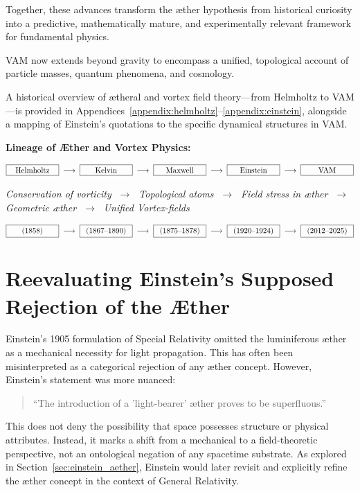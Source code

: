 \documentclass[preprint,notitlepage]{revtex4-2}
\begin{document}
Together, these advances transform the æther hypothesis from historical curiosity into a predictive, mathematically mature, and experimentally relevant framework for fundamental physics.

VAM now extends beyond gravity to encompass a unified, topological account of particle masses, quantum phenomena, and cosmology.

A historical overview of ætheral and vortex field theory—from Helmholtz to VAM—is provided in Appendices~\ref{appendix:helmholtz}–\ref{appendix:einstein}, alongside a mapping of Einstein’s quotations to the specific dynamical structures in VAM.

\vspace{1em}
\noindent\textbf{Lineage of Æther and Vortex Physics:}

\[\fbox{\makebox[2.2cm][c]{Helmholtz}} \;\longrightarrow\;\fbox{\makebox[2.2cm][c]{Kelvin}} \;\longrightarrow\;\fbox{\makebox[2.2cm][c]{Maxwell}} \;\longrightarrow\;\fbox{\makebox[2.2cm][c]{Einstein}} \;\longrightarrow\;\fbox{\makebox[2.2cm][c]{VAM}}\]

\begin{center}
\scriptsize
\textit{
Conservation of vorticity $\;\rightarrow\;$ Topological atoms $\;\rightarrow\;$ Field stress in æther $\;\rightarrow\;$ Geometric æther $\;\rightarrow\;$ Unified Vortex-fields
}
\end{center}
\[\fbox{\makebox[2.2cm][c]{(1858)}} \;\longrightarrow\;\fbox{\makebox[2.2cm][c]{(1867--1890)}} \;\longrightarrow\;\fbox{\makebox[2.2cm][c]{(1875--1878)}} \;\longrightarrow\;\fbox{\makebox[2.2cm][c]{(1920--1924)}} \;\longrightarrow\;\fbox{\makebox[2.2cm][c]{(2012--2025)}}\]

\vspace{1em}
\section{Reevaluating Einstein’s Supposed Rejection of the Æther}

Einstein’s 1905 formulation of Special Relativity omitted the luminiferous æther as a mechanical necessity for light propagation. This has often been misinterpreted as a categorical rejection of any æther concept. However, Einstein’s statement was more nuanced:
\begin{quote}
    ``The introduction of a 'light-bearer' æther proves to be superfluous.''
\end{quote}

This does not deny the possibility that space possesses structure or physical attributes. Instead, it marks a shift from a mechanical to a field-theoretic perspective, not an ontological negation of any spacetime substrate. As explored in Section~\ref{sec:einstein_aether}, Einstein would later revisit and explicitly refine the æther concept in the context of General Relativity.
\end{document}
